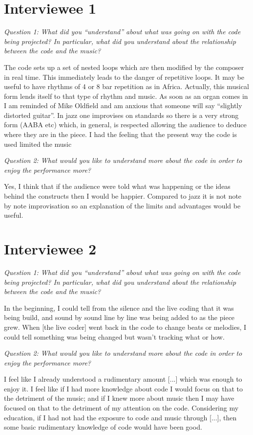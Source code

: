 
\section*{Interviewee 1}
\textit{Question 1: What did you ``understand'' about what was going on with the code being projected? In particular, what did you understand about the relationship between the code and the music?}

The code sets up a set of nested loops which are then modified by the composer in real time. This immediately leads to the danger of repetitive loops. It may be useful to have rhythms of 4 or 8 bar repetition as in Africa. Actually, this musical form lends itself to that type of rhythm and music. As soon as an organ comes in I am reminded of Mike Oldfield and am anxious that someone will say “slightly distorted guitar”. In jazz one improvises on standards so there is a very strong form (AABA etc) which, in general, is respected allowing the audience to deduce where they are in the piece. I had the feeling that the present way the code is used limited the music

\textit{Question 2: What would you like to understand more about the code in order to enjoy the performance more?}

Yes, I think that if the audience were told what was happening or the ideas behind the constructs then I would be happier. Compared to jazz it is not note by note improvisation so an explanation of the limits and advantages would be useful.

\section*{Interviewee 2}

\textit{Question 1: What did you ``understand'' about what was going on with the code being projected? In particular, what did you understand about the relationship between the code and the music?}

In the beginning, I could tell from the silence and the live coding that it was being build, and sound by sound line by line was being added to as the piece grew.  When [the live coder] went back in the code to change beats or melodies, I could tell something was being changed but wasn't tracking what or how.

\textit{Question 2: What would you like to understand more about the code in order to enjoy the performance more?}

I feel like I already understood a rudimentary amount [...] which was enough to enjoy it.  I feel like if I had more knowledge about code I would focus on that to the detriment of the music; and if I knew more about music then I may have focused on that to the detriment of my attention on the code.  Considering my education, if I had not had the exposure to code and music through [...], then some basic rudimentary knowledge of code would have been good.

